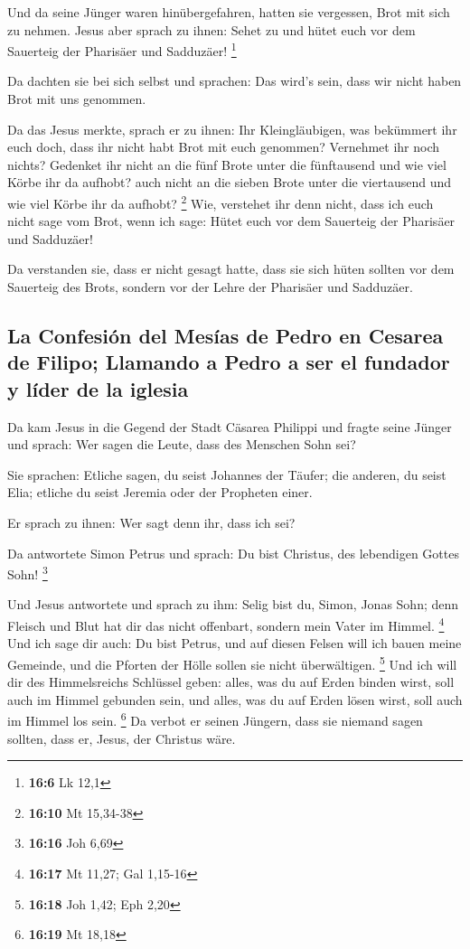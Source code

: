  Und da seine Jünger waren hinübergefahren, hatten sie
vergessen, Brot mit sich zu nehmen.  Jesus aber sprach zu
ihnen: Sehet zu und hütet euch vor dem Sauerteig der Pharisäer und
Sadduzäer! \footnote{\textbf{16:6} Lk 12,1}

 Da dachten sie bei sich selbst und sprachen: Das wird's
sein, dass wir nicht haben Brot mit uns genommen.

 Da das Jesus merkte, sprach er zu ihnen: Ihr
Kleingläubigen, was bekümmert ihr euch doch, dass ihr nicht habt Brot
mit euch genommen?  Vernehmet ihr noch nichts? Gedenket
ihr nicht an die fünf Brote unter die fünftausend und wie viel Körbe ihr
da aufhobt?  auch nicht an die sieben Brote unter die
viertausend und wie viel Körbe ihr da aufhobt? \footnote{\textbf{16:10}
  Mt 15,34-38}  Wie, verstehet ihr denn nicht, dass ich
euch nicht sage vom Brot, wenn ich sage: Hütet euch vor dem Sauerteig
der Pharisäer und Sadduzäer!

 Da verstanden sie, dass er nicht gesagt hatte, dass sie
sich hüten sollten vor dem Sauerteig des Brots, sondern vor der Lehre
der Pharisäer und Sadduzäer.

\hypertarget{la-confesiuxf3n-del-mesuxedas-de-pedro-en-cesarea-de-filipo-llamando-a-pedro-a-ser-el-fundador-y-luxedder-de-la-iglesia}{%
\subsection{La Confesión del Mesías de Pedro en Cesarea de Filipo;
Llamando a Pedro a ser el fundador y líder de la
iglesia}\label{la-confesiuxf3n-del-mesuxedas-de-pedro-en-cesarea-de-filipo-llamando-a-pedro-a-ser-el-fundador-y-luxedder-de-la-iglesia}}

 Da kam Jesus in die Gegend der Stadt Cäsarea Philippi
und fragte seine Jünger und sprach: Wer sagen die Leute, dass des
Menschen Sohn sei?

 Sie sprachen: Etliche sagen, du seist Johannes der
Täufer; die anderen, du seist Elia; etliche du seist Jeremia oder der
Propheten einer.

 Er sprach zu ihnen: Wer sagt denn ihr, dass ich sei?

 Da antwortete Simon Petrus und sprach: Du bist Christus,
des lebendigen Gottes Sohn! \footnote{\textbf{16:16} Joh 6,69}

 Und Jesus antwortete und sprach zu ihm: Selig bist du,
Simon, Jonas Sohn; denn Fleisch und Blut hat dir das nicht offenbart,
sondern mein Vater im Himmel. \footnote{\textbf{16:17} Mt 11,27; Gal
  1,15-16}  Und ich sage dir auch: Du bist Petrus, und
auf diesen Felsen will ich bauen meine Gemeinde, und die Pforten der
Hölle sollen sie nicht überwältigen. \footnote{\textbf{16:18} Joh 1,42;
  Eph 2,20}  Und ich will dir des Himmelsreichs Schlüssel
geben: alles, was du auf Erden binden wirst, soll auch im Himmel
gebunden sein, und alles, was du auf Erden lösen wirst, soll auch im
Himmel los sein. \footnote{\textbf{16:19} Mt 18,18}  Da
verbot er seinen Jüngern, dass sie niemand sagen sollten, dass er,
Jesus, der Christus wäre.

